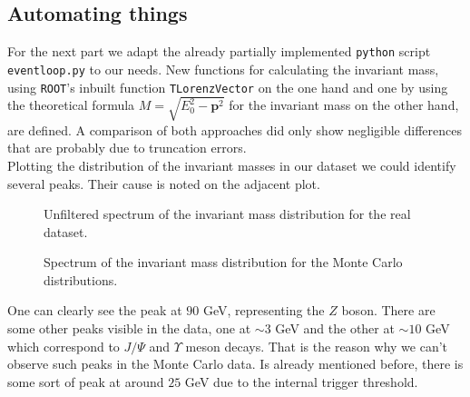 \documentclass[twocolumn,
			   showpacs,%
               nofootinbib,
               aps,%
               prd,
               notitlepage,
               showkeys,
               10pt]{revtex4-1}
\begin{document}
\subsection{Automating things}
For the next part we adapt the already partially implemented \verb|python| script \verb|eventloop.py| to our needs. New functions for calculating the invariant mass, using \verb|ROOT|'s inbuilt function \verb|TLorenzVector| on the one hand and one by using the theoretical formula $M = \sqrt{E_0^2 - \mathbf{p}^2}$ for the invariant mass on the other hand, are defined. A comparison of both approaches did only show negligible differences that are probably due to truncation errors.\\

Plotting the distribution of the invariant masses in our dataset we could identify several peaks. Their cause is noted on the adjacent plot.
\begin{figure}[H]
	\centering
	\caption{Unfiltered spectrum of the invariant mass distribution for the real dataset.}
\end{figure}

\begin{figure}[H]
	\centering
	\caption{Spectrum of the invariant mass distribution for the Monte Carlo distributions.}
\end{figure}
One can clearly see the peak at $90$ GeV, representing the $Z$ boson. There are some other peaks visible in the data, one at $\sim 3$ GeV and the other at $\sim 10$ GeV which correspond to $J/\Psi$ and $\Upsilon$ meson decays. That is the reason why we can't observe such peaks in the Monte Carlo data. Is already mentioned before, there is some sort of peak at around $25$ GeV due to the internal trigger threshold.
\end{document}
